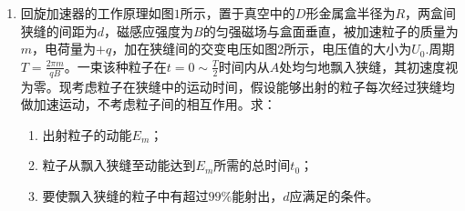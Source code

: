 \begin{enumerate}[leftmargin=0em]
\begin{enumerate}
\end{enumerate}
\begin{figure}[h!]
\flushright

\end{figure}





\newpage
\item
{}
回旋加速器的工作原理如图$ 1 $所示，置于真空中的$ D $形金属盒半径为$ R $，两盒间狭缝的间距为$ d $，磁感应强度为$ B $的匀强磁场与盒面垂直，被加速粒子的质量为$ m $，电荷量为$ +q $，加在狭缝间的交变电压如图$ 2 $所示，电压值的大小为$ U_{0} $.周期$T = \frac { 2 \pi m } { q B }$。一束该种粒子在$t = 0 \sim \frac { T } { 2 }$时间内从$ A $处均匀地飘入狭缝，其初速度视为零。现考虑粒子在狭缝中的运动时间，假设能够出射的粒子每次经过狭缝均做加速运动，不考虑粒子间的相互作用。求： 
\begin{enumerate}
\renewcommand{\labelenumii}{(\arabic{enumii})}

\item 
出射粒子的动能$ E_m $；

\item 
粒子从飘入狭缝至动能达到$ E_m $所需的总时间$ t_{0} $；

\item 
要使飘入狭缝的粒子中有超过$ 99 \% $能射出，$ d $应满足的条件。


\end{enumerate}
\begin{figure}[h!]
\flushright

\end{figure}


\end{enumerate}
